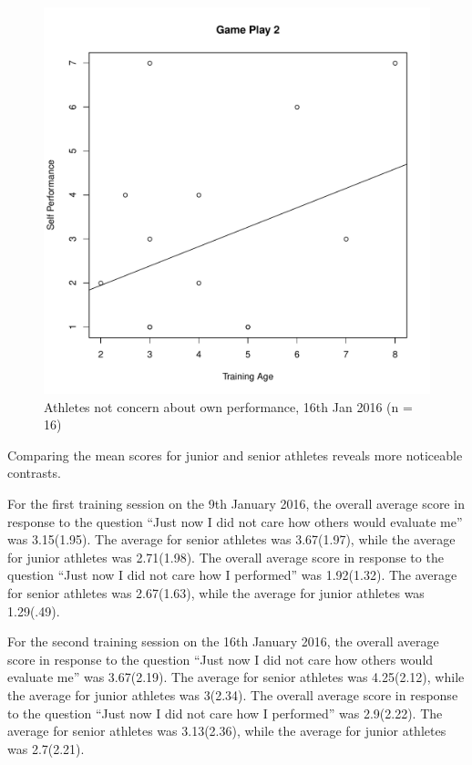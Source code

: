 \begin{CJK}{UTF8}{gbsn}
\begin{figure}[htbp]
  \centering
\includegraphics[scale=.5]{images/indPerf0116TrainingAge.pdf}
  \caption{Athletes not concern about own performance, 16th Jan 2016 (n = 16)}
  \label{fig:indPerf0116TrainingAge}
\end{figure}


Comparing the mean scores for junior and senior athletes reveals more  noticeable contrasts.

For the first training session on the 9th January 2016, the overall average score in response to the question ``Just now I did not care how others would evaluate me'' was 3.15(1.95).  The average for senior athletes was 3.67(1.97), while the average for junior athletes was 2.71(1.98).
The overall average score in response to the question ``Just now I did not care how I performed'' was 1.92(1.32).  The average for senior athletes was 2.67(1.63), while the average for junior athletes was 1.29(.49).

For the second training session on the 16th January 2016, the overall average score in response to the question ``Just now I did not care how others would evaluate me'' was 3.67(2.19).  The average for senior athletes was 4.25(2.12), while the average for junior athletes was 3(2.34).
The overall average score in response to the question ``Just now I did not care how I performed'' was 2.9(2.22).  The average for senior athletes was 3.13(2.36), while the average for junior athletes was 2.7(2.21).



\end{CJK}
